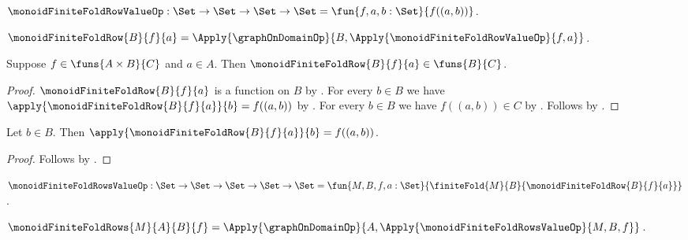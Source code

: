 \begin{definition}\label{monoid_finite_fold_row_value_op}
    $\monoidFiniteFoldRowValueOp:\Set\to\Set\to\Set\to\Set
        =\fun{f,a,b:\Set}{f((a,b))}$.
\end{definition}

\begin{definition}\label{monoid_finite_fold_row}
    $\monoidFiniteFoldRow{B}{f}{a}
        =\Apply{\graphOnDomainOp}{
            B,\Apply{\monoidFiniteFoldRowValueOp}{f,a}}$.
\end{definition}

\begin{proposition}\label{monoid_finite_fold_row_type}
    Suppose $f\in\funs{A\times B}{C}$ and $a\in A$.
    Then $\monoidFiniteFoldRow{B}{f}{a}\in\funs{B}{C}$.
\end{proposition}
\begin{proof}
    $\monoidFiniteFoldRow{B}{f}{a}$ is a function on $B$ by
        .
    For every $b\in B$ we have
        $\apply{\monoidFiniteFoldRow{B}{f}{a}}{b}=f((a,b))$ by
        .
    For every $b\in B$ we have $f((a,b))\in C$ by
        .
    Follows by .
\end{proof}

\begin{proposition}\label{monoid_finite_fold_row_apply}
    Let $b\in B$.
    Then
        $\apply{\monoidFiniteFoldRow{B}{f}{a}}{b}=f((a,b))$.
\end{proposition}
\begin{proof}
    Follows by
        .
\end{proof}

\begin{definition}\label{monoid_finite_fold_rows_value_op}
    $\monoidFiniteFoldRowsValueOp:\Set\to\Set\to\Set\to\Set\to\Set
        =\fun{M,B,f,a:\Set}{
            \finiteFold{M}{B}{\monoidFiniteFoldRow{B}{f}{a}}}$.
\end{definition}

\begin{definition}\label{monoid_finite_fold_rows}
    $\monoidFiniteFoldRows{M}{A}{B}{f}
        =\Apply{\graphOnDomainOp}{
            A,\Apply{\monoidFiniteFoldRowsValueOp}{M,B,f}}$.
\end{definition}

